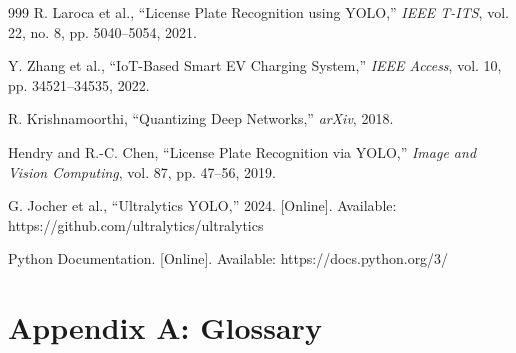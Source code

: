 \begin{thebibliography}{999}
R. Laroca et al., ``License Plate Recognition using YOLO,'' \textit{IEEE T-ITS}, vol. 22, no. 8, pp. 5040--5054, 2021.

Y. Zhang et al., ``IoT-Based Smart EV Charging System,'' \textit{IEEE Access}, vol. 10, pp. 34521--34535, 2022.

R. Krishnamoorthi, ``Quantizing Deep Networks,'' \textit{arXiv}, 2018.

Hendry and R.-C. Chen, ``License Plate Recognition via YOLO,'' \textit{Image and Vision Computing}, vol. 87, pp. 47--56, 2019.

G. Jocher et al., ``Ultralytics YOLO,'' 2024. [Online]. Available: https://github.com/ultralytics/ultralytics

Python Documentation. [Online]. Available: https://docs.python.org/3/

\end{thebibliography}

\section*{Appendix A: Glossary}

